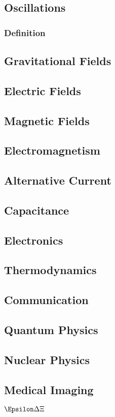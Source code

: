 \documentclass[]{article}
\begin{document}
\subsection{Oscillations}\label{header-n90}

\subsubsection{Definition}\label{header-n91}

\subsection{Gravitational Fields}\label{header-n93}

\subsection{Electric Fields}\label{header-n95}

\subsection{Magnetic Fields}\label{header-n97}

\subsection{Electromagnetism}\label{header-n99}

\subsection{Alternative Current}\label{header-n101}

\subsection{Capacitance}\label{header-n103}

\subsection{Electronics}\label{header-n105}

\subsection{Thermodynamics}\label{header-n107}

\subsection{Communication}\label{header-n109}

\subsection{Quantum Physics}\label{header-n111}

\subsection{Nuclear Physics}\label{header-n113}

\subsection{Medical Imaging}\label{header-n115}

\(\Epsilon \Delta\Xi\)
\end{document}
